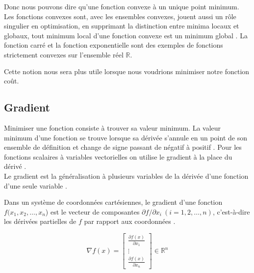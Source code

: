 		Donc nous pouvons dire qu'une fonction convexe à un unique point minimum. Les fonctions convexes sont, avec les ensembles convexes, jouent aussi un rôle singulier en optimisation, en supprimant la distinction entre minima locaux et globaux, tout minimum local d'une fonction convexe est un minimum global \cite{coulombeau2013math}.
		La fonction carré et la fonction exponentielle sont des exemples de fonctions strictement convexes sur l'ensemble réel $\mathbb {R} $.
		
		Cette notion nous sera plus utile lorsque nous voudrions minimiser notre fonction coût.  
		
		\subsection{{Gradient}}\label{sec:gradient}
		Minimiser une fonction consiste à trouver sa valeur minimum. La valeur minimum d'une fonction se trouve lorsque sa dérivée s'annule en un point de son ensemble de définition et change de signe passant de négatif à positif \cite{coulombeau2013math}. Pour les fonctions scalaires à variables vectorielles on utilise le gradient à la place du dérivé \cite{jtshiman:2021}.\\
		Le gradient est la généralisation à plusieurs variables de la dérivée d'une fonction d'une seule variable \cite{benner2015numerical, bierlaire2006introduction}.%
		
		Dans un système de coordonnées cartésiennes, le gradient d'une fonction {$ f(x_{1},x_{2},\dots ,x_{n}$)} est le vecteur de composantes {$ \partial f/ \partial x_{i}\ (i=1,2,\dots ,n)$}, c'est-à-dire les dérivées partielles de $f$ par rapport aux coordonnées \cite{jtshiman:2021}.
		
		\begin{equation}
			{\nabla f(x)={
					\begin{bmatrix}
					{\frac {\partial f(x)}{\partial x_{1}}}\\
					\vdots \\
					{\frac {\partial f(x)}{\partial x_{n}}}
					\end{bmatrix}}} \in \mathbb{R}^n 
		\end{equation}
		
